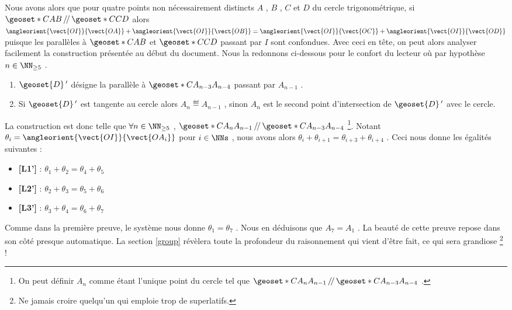 \vspace{1em}


Nous avons alors que pour quatre points non nécessairement distincts $A$ , $B$ , $C$ et $D$ du cercle trigonométrique, si $\geoset*{C}{AB} \,/\!/\,\geoset*{C}{CD}$ alors
$\angleorient{\vect{OI}}{\vect{OA}} + \angleorient{\vect{OI}}{\vect{OB}} 
=
 \angleorient{\vect{OI}}{\vect{OC}} + \angleorient{\vect{OI}}{\vect{OD}}$ 
puisque les parallèles à $\geoset*{C}{AB}$ et $\geoset*{C}{CD}$ passant par $I$ sont confondues.
Avec ceci en tête, on peut alors analyser facilement la construction présentée au début du document.
Nous la redonnons ci-dessous pour le confort du lecteur où par hypothèse $n \in \NN_{\geq 5}$ .

\begin{enumerate}
	\item $\geoset{D}\,'$ désigne la parallèle à $\geoset*{C}{A_{n-3} A_{n-4}}$ passant par $A_{n-1}$ .

	\item Si $\geoset{D}\,'$ est tangente au cercle alors $A_n \eqdef A_{n-1}$ , sinon $A_n$ est le second point d'intersection de $\geoset{D}\,'$ avec le cercle.
\end{enumerate}


\medskip

La construction est donc telle que $\forall n \in \NN_{\geq 5}$ , 
$\geoset*{C}{A_{n} A_{n-1}} \,/\!/\, \geoset*{C}{A_{n-3} A_{n-4}}$ 
\footnote{
	On peut définir $A_{n}$ comme étant l'unique point du cercle tel que $\geoset*{C}{A_{n} A_{n-1}} \,/\!/\, \geoset*{C}{A_{n-3} A_{n-4}}$  .
}.
Notant $\theta_i = \angleorient{\vect{OI}}{\vect{OA_i}}$ pour $i \in \NNs$ , nous avons alors
$\theta_i + \theta_{i+1} = \theta_{i+3} + \theta_{i+4}$ . Ceci nous donne les égalités suivantes :
\begin{itemize}[label=\small\textbullet]
	\item \textbf{[L1']} : 
	      $\theta_1 + \theta_{2} = \theta_{4} + \theta_{5}$

	\item \textbf{[L2']} : 
	      $\theta_2 + \theta_{3} = \theta_{5} + \theta_{6}$

	\item \textbf{[L3']} : 
	      $\theta_3 + \theta_{4} = \theta_{6} + \theta_{7}$
\end{itemize}


\medskip

Comme dans la première preuve, le système nous donne $\theta_1 = \theta_7$ . Nous en déduisons que $A_7 = A_1$ . La beauté de cette preuve repose dans son côté presque automatique. La section \ref{group} révèlera toute la profondeur du raisonnement qui vient d'être fait, ce qui sera grandiose
\footnote{
	Ne jamais croire quelqu'un qui emploie trop de superlatifs.
} !
